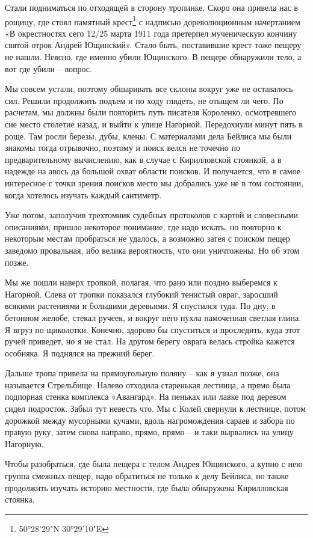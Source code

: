 Стали подниматься по отходящей в сторону тропинке. Скоро она привела нас в рощицу, где стоял памятный крест\footnote{50°28'29"N 30°29'10"E} с надписью  дореволюционным начертанием «В окрестностях сего 12/25 марта 1911 года претерпел мученическую кончину святой отрок Андрей Ющинский». Стало быть, поставившие крест тоже  пещеру не нашли. Неясно, где именно убили Ющинского. В пещере обнаружили тело, а вот где убили – вопрос.

Мы совсем устали, поэтому обшаривать все склоны вокруг уже не оставалось сил. Решили продолжить подъем и по ходу глядеть, не отыщем ли чего. По расчетам, мы должны были повторить путь писателя Короленко, осмотревшего сие место столетие назад, и выйти к улице Нагорной. Передохнули минут пять в роще. Там росли березы, дубы, клены. С материалами дела Бейлиса мы были знакомы тогда отрывочно, поэтому и поиск велся не точечно по предварительному вычислению, как в случае с Кирилловской стоянкой, а в надежде на авось да большой охват области поисков. И получается, что в самое интересное с точки зрения поисков место мы добрались уже не в том состоянии, когда хотелось изучать каждый сантиметр.

Уже потом, заполучив трехтомник судебных протоколов с картой и словесными описаниями, пришло некоторое понимание, где надо искать, но повторно к некоторым местам пробраться не удалось, а возможно затея с поиском пещер заведомо провальная, ибо велика вероятность, что они уничтожены. Но об этом позже.

Мы же пошли наверх тропкой, полагая, что рано или поздно выберемся к Нагорной. Слева от тропки показался глубокий тенистый овраг, заросший всякими растениями и большими деревьями. Я спустился туда. По дну, в бетонном желобе, стекал ручеек, и вокруг него пухла намоченная светлая глина. Я вгруз по щиколотки. Конечно, здорово бы спуститься и проследить, куда этот ручей приведет, но я не стал. На другом берегу оврага велась стройка кажется особняка. Я поднялся на прежний берег.

Дальше тропа привела на прямоугольную поляну – как я узнал позже, она называется Стрельбище. Налево отходила старенькая лестница, а прямо была подпорная стенка комплекса «Авангард». На пеньках или лавке под деревом сидел подросток. Забыл тут невесть что. Мы с Колей свернули к лестнице, потом дорожкой между мусорными кучами, вдоль нагромождения сараев и забора по правую руку, затем снова направо, прямо, прямо – и таки вырвались на улицу Нагорную.

Чтобы разобраться, где была пещера с телом Андрея Ющинского, а купно с нею группа смежных пещер, надо обратиться не только к делу Бейлиса, но также продолжить изучать историю местности, где была обнаружена Кирилловская стоянка.

